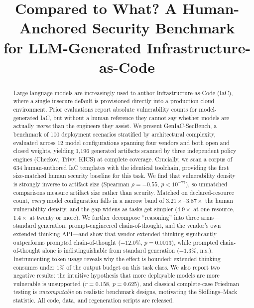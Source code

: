 \documentclass[conference]{IEEEtran}
\begin{document}
\title{Compared to What? A Human-Anchored Security Benchmark\\
for LLM-Generated Infrastructure-as-Code}

\author{
}

\maketitle

\begin{abstract}
Large language models are increasingly used to author Infrastructure-as-Code
(IaC), where a single insecure default is provisioned directly into a production
cloud environment. Prior evaluations report absolute vulnerability counts for
model-generated IaC, but without a human reference they cannot say whether
models are actually \emph{worse} than the engineers they assist. We present
GenIaC-SecBench, a benchmark of 100 deployment scenarios stratified by
architectural complexity, evaluated across 12 model configurations spanning four
vendors and both open and closed weights, yielding 1{,}196 generated artifacts
scanned by three independent policy engines (Checkov, Trivy, KICS) at complete
coverage. Crucially, we scan a corpus of 634 human-authored IaC templates with
the identical toolchain, providing the first size-matched human security
baseline for this task.
We find that vulnerability density is strongly inverse to artifact size
(Spearman $\rho=-0.55$, $p<10^{-77}$), so unmatched comparisons measure artifact
size rather than security. Matched on declared-resource count, \emph{every}
model configuration falls in a narrow band of $3.21\times$--$3.87\times$ the
human vulnerability density, and the gap widens as tasks get simpler
($4.9\times$ at one resource, $1.4\times$ at twenty or more).
We further decompose ``reasoning'' into three arms---standard generation,
prompt-engineered chain-of-thought, and the vendor's own extended-thinking
API---and show that vendor extended thinking significantly outperforms prompted
chain-of-thought ($-12.0\%$, $p=0.0013$), while prompted chain-of-thought alone
is indistinguishable from standard generation ($-1.3\%$, n.s.). Instrumenting
token usage reveals why the effect is bounded: extended thinking consumes under
$1\%$ of the output budget on this task class.
We also report two negative results: the intuitive hypothesis that more
deployable models are more vulnerable is unsupported ($r=0.158$, $p=0.625$), and
classical complete-case Friedman testing is \emph{uncomputable} on realistic
benchmark designs, motivating the Skillings--Mack statistic. All code, data, and
regeneration scripts are released.
\end{abstract}
\end{document}
